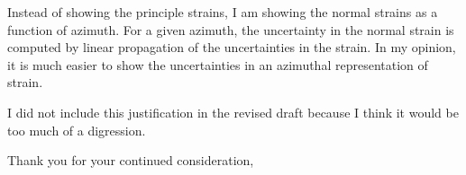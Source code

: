 \documentclass[10pt,a4paper]{letter}
\begin{document}
\begin{letter}{}
Instead of showing the principle strains, I am showing the normal
strains as a function of azimuth. For a given azimuth, the uncertainty
in the normal strain is computed by linear propagation of the
uncertainties in the strain. In my opinion, it is much easier to show
the uncertainties in an azimuthal representation of strain.

I did not include this justification in the revised draft because I
think it would be too much of a digression.

\closing{Thank you for your continued consideration,}

\end{letter}
\end{document}
